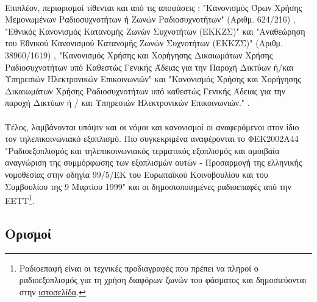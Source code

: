 \documentclass[a4paper, 12pt, twoside]{report}
\begin{document}
{{{{{{			\paragraph{}{Επιπλέον, περιορισμοί τίθενται και από τις αποφάσεις : "Κανονισμός Όρων Χρήσης Μεμονωμένων Ραδιοσυχνοτήτων ή Ζωνών Ραδιοσυχνοτήτων" (Αριθμ. 624/216) \cite{ΦΕΚ2011Β2512}, "Εθνικός Κανονισμός Κατανομής Ζωνών Συχνοτήτων (ΕΚΚΖΣ)" \cite{ΦΕΚ2006Β399} και "Αναθεώρηση του Εθνικού Κανονισμού Κατανομής Ζωνών Συχνοτήτων (ΕΚΚΖΣ)" (Αριθμ. 38960/1619) \cite{ΦΕΚ2008Β1979}, "Κανονισμός Χρήσης και Χορήγησης Δικαιωμάτων Χρήσης Ραδιοσυχνοτήτων υπό Καθεστώς Γενικής Άδειας για την Παροχή Δικτύων ή/και Υπηρεσιών Ηλεκτρονικών Επικοινωνιών" \cite{ΦΕΚ2006Β750} και "Κανονισμός Χρήσης και Χορήγησης Δικαιωμάτων Χρήσης Ραδιοσυχνοτήτων υπό καθεστώς Γενικής Άδειας για την παροχή Δικτύων ή / και Υπηρεσιών Ηλεκτρονικών Επικοινωνιών." \cite{ΦΕΚ2006Β750}.
			}
			\paragraph{}{Τέλος, λαμβάνονται υπόψιν και οι νόμοι και κανονισμοί οι αναφερόμενοι στον ίδιο τον τηλεπικοινωνιακό εξοπλισμό. Πιο συγκεκριμένα αναφέρονται το ΦΕΚ2002Α44 "Ραδιοεξοπλισμός και τηλεπικοινωνιακός τερματικός εξοπλισμός και αμοιβαία αναγνώριση της συμμόρφωσης των εξοπλισμών αυτών - Προσαρμογή της ελληνικής νομοθεσίας στην οδηγία 99/5/ΕΚ του Ευρωπαϊκού Κοινοβουλίου και του Συμβουλίου της 9 Μαρτίου 1999" \cite{ΦΕΚ2002Α44} και οι δημοσιοποιημένες ραδιοεπαφές από την ΕΕΤΤ\footnote{Ραδιοεπαφή είναι οι τεχνικές προδιαγραφές που πρέπει να πληροί ο ραδιοεξοπλισμός για τη χρήση διαφόρων ζωνών του φάσματος και δημοσιεύονται στην \href{http://www.eett.gr/opencms/opencms/EETT/Electronic_Communications/Radio_Communications/TelecommunicationsEquipment/InterRadioReg.html}{ιστοσελίδα}.}.
			}
			
		\subsection{Ορισμοί}
		
}}}}}}
\end{document}
